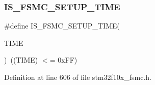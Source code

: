 \subsubsection{\texorpdfstring{I\+S\+\_\+\+F\+S\+M\+C\+\_\+\+S\+E\+T\+U\+P\+\_\+\+T\+I\+ME}{IS\_FSMC\_SETUP\_TIME}}
{\footnotesize\ttfamily \#define I\+S\+\_\+\+F\+S\+M\+C\+\_\+\+S\+E\+T\+U\+P\+\_\+\+T\+I\+ME(\begin{DoxyParamCaption}\item[{}]{T\+I\+ME }\end{DoxyParamCaption})~((T\+I\+ME) $<$= 0x\+F\+F)}



Definition at line 606 of file stm32f10x\+\_\+fsmc.\+h.

